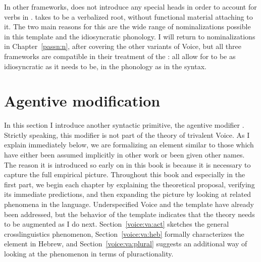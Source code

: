 In other frameworks, \cite{doron03} does not introduce any special heads in order to account for verbs in {\tkal}. \cite{borer13oup,borer15roots} takes {\tkal} to be a verbalized root, without functional material attaching to it. The two main reasons for this are the wide range of nominalizations possible in this template and the idiosyncratic phonology. I will return to nominalizations in Chapter~\ref{passn:n}, after covering the other variants of Voice, but all three frameworks are compatible in their treatment of the {\tkal}: all allow for {\tkal} to be as idiosyncratic as it needs to be, in the phonology as in the syntax.


\section{Agentive modification} \label{voice:va}
In this section I introduce another syntactic primitive, the agentive modifier {\va}. Strictly speaking, this modifier is not part of the theory of trivalent Voice. As I explain immediately below, we are formalizing an element similar to those which have either been assumed implicitly in other work or been given other names. The reason it is introduced so early on in this book is because it is necessary to capture the full empirical picture. Throughout this book and especially in the first part, we begin each chapter by explaining the theoretical proposal, verifying its immediate predictions, and then expanding the picture by looking at related phenomena in the language. Underspecified Voice and the template {\tkal} have already been addressed, but the behavior of the template {\tpie} indicates that the theory needs to be augmented as I do next. Section~\ref{voice:va:act} sketches the general crosslinguistics phenomenon, Section~\ref{voice:va:heb} formally characterizes the element {\va} in Hebrew, and Section~\ref{voice:va:plural} suggests an additional way of looking at the phenomenon in terms of pluractionality.

